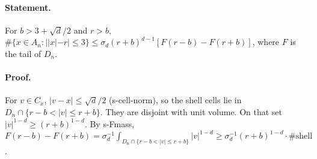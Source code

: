 \paragraph{Statement.} For $b>3+\sqrt d/2$ and $r>b$, $\#\{x\in A_n:||x|-r|\leq3\}\leq\sigma_d(r+b)^{d-1}[F(r-b)-F(r+b)]$,
where $F$ is the tail of $D_n$.
\paragraph{Proof.} For $v\in C_x$, $|v-x|\leq\sqrt d/2$ (s-cell-norm), so the shell cells lie in
$D_n\cap\{r-b<|v|\leq r+b\}$. They are disjoint with unit volume. On that set $|v|^{1-d}\geq(r+b)^{1-d}$. By s-Fmass,
$F(r-b)-F(r+b)=\sigma_d^{-1}\int_{D_n\cap\{r-b<|v|\leq r+b\}}|v|^{1-d}\geq\sigma_d^{-1}(r+b)^{1-d}\cdot\#\text{shell}$.
